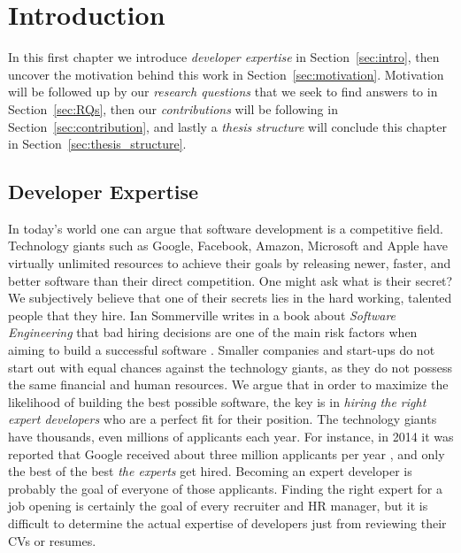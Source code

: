 \chapter{Introduction}

    In this first chapter we introduce \emph{developer expertise} in Section~\ref{sec:intro}, then uncover the motivation behind this work in Section~\ref{sec:motivation}. Motivation will be followed up by our \emph{research questions} that we seek to find answers to in Section~\ref{sec:RQs}, then our \emph{contributions} will be following in Section~\ref{sec:contribution}, and lastly a \emph{thesis structure} will conclude this chapter in Section~\ref{sec:thesis_structure}.
    
    \section{Developer Expertise\label{sec:intro}}
    
        In today's world one can argue that software development is a competitive field. Technology giants such as Google, Facebook, Amazon, Microsoft and Apple have virtually unlimited resources to achieve their goals by releasing newer, faster, and better software than their direct competition. One might ask what is their secret? We subjectively believe that one of their secrets lies in the hard working, talented people that they hire. Ian Sommerville writes in a book about \emph{Software Engineering} that bad hiring decisions are one of the main risk factors when aiming to build a successful software \cite{sommerville2016software}. Smaller companies and start-ups do not start out with equal chances against the technology giants, as they do not possess the same financial and human resources. We argue that in order to maximize the likelihood of building the best possible software, the key is in \emph{hiring the right expert developers} who are a perfect fit for their position. The technology giants have thousands, even millions of applicants each year. For instance, in 2014 it was reported that Google received about three million applicants per year \cite{nisen_2014}, and only the best of the best \emph{the experts} get hired. Becoming an expert developer is probably the goal of everyone of those applicants. Finding the right expert for a job opening is certainly the goal of every recruiter and HR manager, but it is difficult to determine the actual expertise of developers just from reviewing their CVs or resumes.
    
